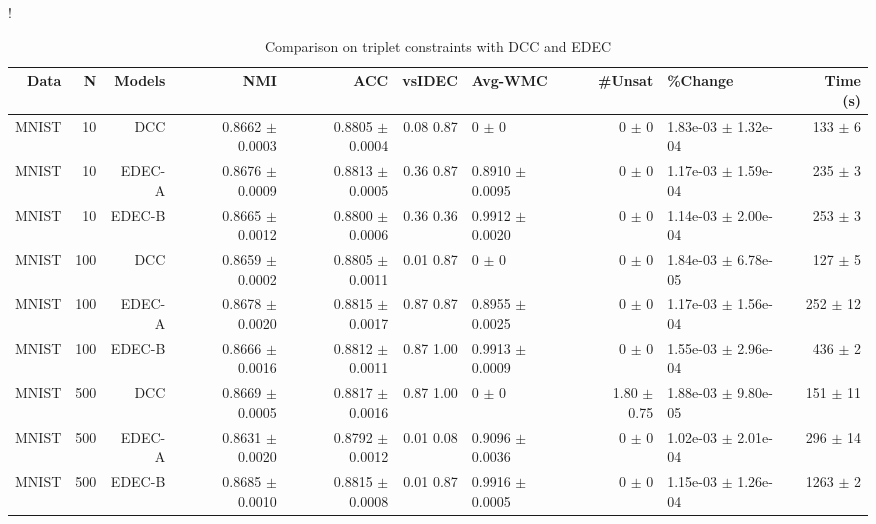 \begin{table}[ht]
\caption{Comparison on triplet constraints with DCC and EDEC}\label{tab:triplet}
\resizebox{\columnwidth}!{
\begin{tabular}{ | r | r | r | r | r | r | H  r | H  r |}
\hline
Data & N & Models & NMI & ACC & vsIDEC & Avg-WMC & \#Unsat & \%Change & Time (s)  \\ \hline 
MNIST & 10 & DCC & 0.8662 $\pm$ 0.0003 & { \color{blue} 0.8805 $\pm$ 0.0004} & { \color{black}0.08} { \color{black}0.87} & 0 $\pm$ 0 & 0 $\pm$ 0 & 1.83e-03 $\pm$ 1.32e-04 & 133 $\pm$ 6 \\ 
MNIST & 10 & EDEC-A & { \color{green} 0.8676 $\pm$ 0.0009} & { \color{green} 0.8813 $\pm$ 0.0005} & { \color{green} 0.36} { \color{black}0.87} & 0.8910 $\pm$ 0.0095 & 0 $\pm$ 0 & 1.17e-03 $\pm$ 1.59e-04 & 235 $\pm$ 3 \\ 
MNIST & 10 & EDEC-B & { \color{blue} 0.8665 $\pm$ 0.0012} & { \color{blue} 0.8800 $\pm$ 0.0006} & { \color{black}0.36} { \color{black}0.36} & 0.9912 $\pm$ 0.0020 & 0 $\pm$ 0 & 1.14e-03 $\pm$ 2.00e-04 & 253 $\pm$ 3 \\ \hline 
MNIST & 100 & DCC & { \color{blue} 0.8659 $\pm$ 0.0002} & { \color{blue} 0.8805 $\pm$ 0.0011} & { \color{black}0.01} { \color{black}0.87} & 0 $\pm$ 0 & 0 $\pm$ 0 & 1.84e-03 $\pm$ 6.78e-05 & 127 $\pm$ 5 \\ 
MNIST & 100 & EDEC-A & { \color{green} 0.8678 $\pm$ 0.0020} & { \color{green} 0.8815 $\pm$ 0.0017} & { \color{green} 0.87} { \color{green} 0.87} & 0.8955 $\pm$ 0.0025 & 0 $\pm$ 0 & 1.17e-03 $\pm$ 1.56e-04 & 252 $\pm$ 12 \\ 
MNIST & 100 & EDEC-B & { \color{blue} 0.8666 $\pm$ 0.0016} & { \color{blue} 0.8812 $\pm$ 0.0011} & { \color{black}0.87} { \color{black}1.00} & 0.9913 $\pm$ 0.0009 & 0 $\pm$ 0 & 1.55e-03 $\pm$ 2.96e-04 & 436 $\pm$ 2 \\ \hline 
MNIST & 500 & DCC & 0.8669 $\pm$ 0.0005 & { \color{green} 0.8817 $\pm$ 0.0016} & { \color{green} 0.87} { \color{green} 1.00} & 0 $\pm$ 0 & 1.80 $\pm$ 0.75 & 1.88e-03 $\pm$ 9.80e-05 & 151 $\pm$ 11 \\ 
MNIST & 500 & EDEC-A & 0.8631 $\pm$ 0.0020 & { \color{blue} 0.8792 $\pm$ 0.0012} & { \color{black}0.01} { \color{black}0.08} & 0.9096 $\pm$ 0.0036 & 0 $\pm$ 0 & 1.02e-03 $\pm$ 2.01e-04 & 296 $\pm$ 14 \\ 
MNIST & 500 & EDEC-B & { \color{green} 0.8685 $\pm$ 0.0010} & { \color{blue} 0.8815 $\pm$ 0.0008} & { \color{green} 0.01} { \color{green} 0.87} & 0.9916 $\pm$ 0.0005 & 0 $\pm$ 0 & 1.15e-03 $\pm$ 1.26e-04 & 1263 $\pm$ 2 \\ \hline 

\end{tabular}}
\end{table}
